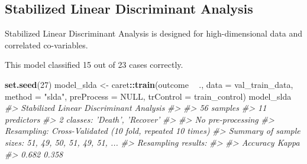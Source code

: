 \documentclass[]{book}
\newenvironment{Shaded}{\begin{snugshade}}{\end{snugshade}}
\newcommand{\CommentTok}[1]{\textcolor[rgb]{0.56,0.35,0.01}{\textit{#1}}}
\newcommand{\DataTypeTok}[1]{\textcolor[rgb]{0.13,0.29,0.53}{#1}}
\newcommand{\DecValTok}[1]{\textcolor[rgb]{0.00,0.00,0.81}{#1}}
\newcommand{\KeywordTok}[1]{\textcolor[rgb]{0.13,0.29,0.53}{\textbf{#1}}}
\newcommand{\NormalTok}[1]{#1}
\newcommand{\OperatorTok}[1]{\textcolor[rgb]{0.81,0.36,0.00}{\textbf{#1}}}
\newcommand{\OtherTok}[1]{\textcolor[rgb]{0.56,0.35,0.01}{#1}}
\newcommand{\StringTok}[1]{\textcolor[rgb]{0.31,0.60,0.02}{#1}}
\begin{document}
\hypertarget{stabilized-linear-discriminant-analysis}{%
\subsection{Stabilized Linear Discriminant Analysis}\label{stabilized-linear-discriminant-analysis}}

Stabilized Linear Discriminant Analysis is designed for high-dimensional data and correlated co-variables.

This model classified 15 out of 23 cases correctly.

\begin{Shaded}
\begin{Highlighting}[]
\KeywordTok{set.seed}\NormalTok{(}\DecValTok{27}\NormalTok{)}
\NormalTok{model_slda <-}\StringTok{ }\NormalTok{caret}\OperatorTok{::}\KeywordTok{train}\NormalTok{(outcome }\OperatorTok{~}\StringTok{ }\NormalTok{.,}
                             \DataTypeTok{data =}\NormalTok{ val_train_data,}
                             \DataTypeTok{method =} \StringTok{"slda"}\NormalTok{,}
                             \DataTypeTok{preProcess =} \OtherTok{NULL}\NormalTok{,}
                             \DataTypeTok{trControl =}\NormalTok{ train_control)}
\NormalTok{model_slda}
\CommentTok{#> Stabilized Linear Discriminant Analysis }
\CommentTok{#> }
\CommentTok{#> 56 samples}
\CommentTok{#> 11 predictors}
\CommentTok{#>  2 classes: 'Death', 'Recover' }
\CommentTok{#> }
\CommentTok{#> No pre-processing}
\CommentTok{#> Resampling: Cross-Validated (10 fold, repeated 10 times) }
\CommentTok{#> Summary of sample sizes: 51, 49, 50, 51, 49, 51, ... }
\CommentTok{#> Resampling results:}
\CommentTok{#> }
\CommentTok{#>   Accuracy  Kappa}
\CommentTok{#>   0.682     0.358}
\end{Highlighting}
\end{Shaded}
\end{document}

